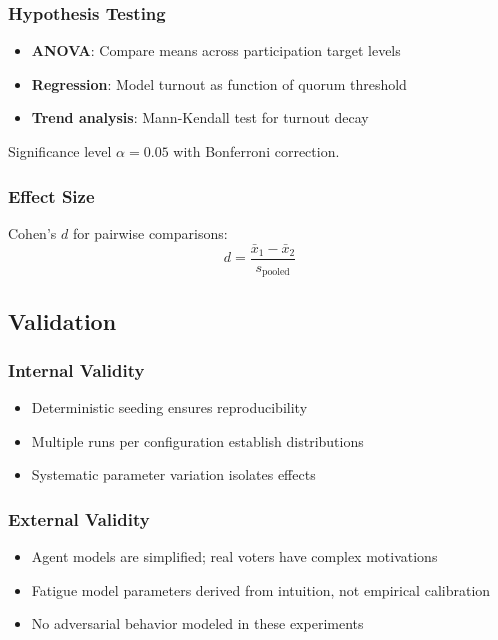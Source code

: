 \subsubsection{Hypothesis Testing}

\begin{itemize}
    \item \textbf{ANOVA}: Compare means across participation target levels
    \item \textbf{Regression}: Model turnout as function of quorum threshold
    \item \textbf{Trend analysis}: Mann-Kendall test for turnout decay
\end{itemize}

Significance level $\alpha = 0.05$ with Bonferroni correction.

\subsubsection{Effect Size}

Cohen's $d$ for pairwise comparisons:
\begin{equation}
d = \frac{\bar{x}_1 - \bar{x}_2}{s_{\text{pooled}}}
\end{equation}

\subsection{Validation}

\subsubsection{Internal Validity}
\begin{itemize}
    \item Deterministic seeding ensures reproducibility
    \item Multiple runs per configuration establish distributions
    \item Systematic parameter variation isolates effects
\end{itemize}

\subsubsection{External Validity}
\begin{itemize}
    \item Agent models are simplified; real voters have complex motivations
    \item Fatigue model parameters derived from intuition, not empirical calibration
    \item No adversarial behavior modeled in these experiments
\end{itemize}

